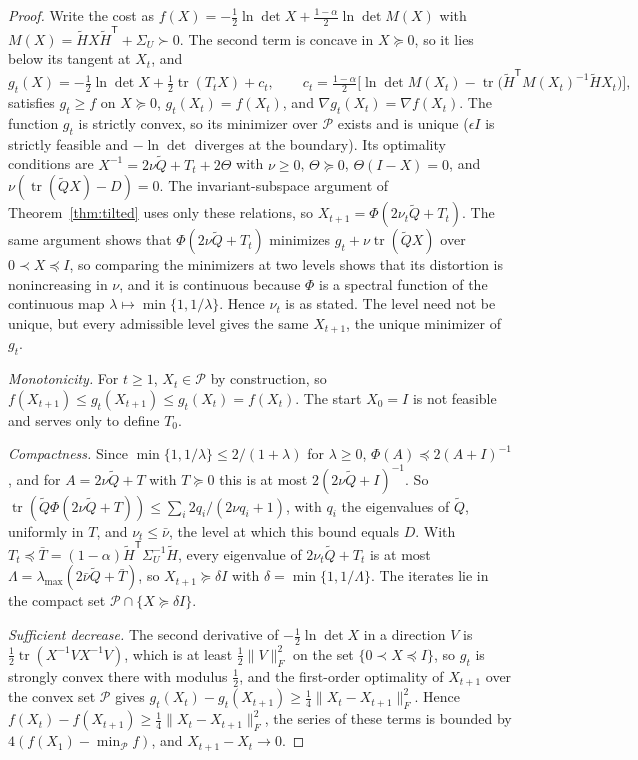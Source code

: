 \documentclass[11pt,onecolumn]{IEEEtran}
\newcommand{\tr}{\operatorname{tr}}
\begin{document}
\begin{proof}
Write the cost as
$f(X)=-\tfrac12\ln\det X+\tfrac{1-\alpha}2\ln\det M(X)$ with
$M(X)=\tilde HX\tilde H^{\mathsf T}+\Sigma_U\succ0$. The second term is concave
in $X\succeq0$, so it lies below its tangent at $X_t$, and
\[
g_t(X)=-\tfrac12\ln\det X+\tfrac12\tr(T_tX)+c_t,\qquad
c_t=\tfrac{1-\alpha}2\bigl[\ln\det M(X_t)-\tr\bigl(\tilde H^{\mathsf T}M(X_t)^{-1}\tilde HX_t\bigr)\bigr],
\]
satisfies $g_t\ge f$ on $X\succeq0$, $g_t(X_t)=f(X_t)$, and
$\nabla g_t(X_t)=\nabla f(X_t)$. The function $g_t$ is strictly convex, so
its minimizer over $\mathcal P$ exists and is unique ($\epsilon I$ is
strictly feasible and $-\ln\det$ diverges at the boundary). Its optimality
conditions are $X^{-1}=2\nu\tilde Q+T_t+2\Theta$ with $\nu\ge0$,
$\Theta\succeq0$, $\Theta(I-X)=0$, and $\nu(\tr(\tilde QX)-D)=0$. The
invariant-subspace argument of Theorem~\ref{thm:tilted} uses only these
relations, so $X_{t+1}=\Phi(2\nu_t\tilde Q+T_t)$. The same argument shows
that $\Phi(2\nu\tilde Q+T_t)$ minimizes $g_t+\nu\tr(\tilde QX)$ over
$0\prec X\preceq I$, so comparing the minimizers at two levels shows that
its distortion is nonincreasing in $\nu$, and it is continuous because
$\Phi$ is a spectral function of the continuous map
$\lambda\mapsto\min\{1,1/\lambda\}$. Hence $\nu_t$ is as stated. The level
need not be unique, but every admissible level gives the same
$X_{t+1}$, the unique minimizer of $g_t$.

\emph{Monotonicity.} For $t\ge1$, $X_t\in\mathcal P$ by construction, so
$f(X_{t+1})\le g_t(X_{t+1})\le g_t(X_t)=f(X_t)$. The start $X_0=I$ is not
feasible and serves only to define $T_0$.

\emph{Compactness.} Since $\min\{1,1/\lambda\}\le2/(1+\lambda)$ for
$\lambda\ge0$, $\Phi(A)\preceq2(A+I)^{-1}$, and for $A=2\nu\tilde Q+T$ with
$T\succeq0$ this is at most $2(2\nu\tilde Q+I)^{-1}$. So
$\tr(\tilde Q\Phi(2\nu\tilde Q+T))\le\sum_i2q_i/(2\nu q_i+1)$, with $q_i$ the
eigenvalues of $\tilde Q$, uniformly in $T$, and $\nu_t\le\bar\nu$, the
level at which this bound equals $D$. With
$T_t\preceq\bar T=(1-\alpha)\tilde H^{\mathsf T}\Sigma_U^{-1}\tilde H$, every
eigenvalue of $2\nu_t\tilde Q+T_t$ is at most
$\Lambda=\lambda_{\max}(2\bar\nu\tilde Q+\bar T)$, so $X_{t+1}\succeq\delta I$
with $\delta=\min\{1,1/\Lambda\}$. The iterates lie in the compact set
$\mathcal P\cap\{X\succeq\delta I\}$.

\emph{Sufficient decrease.} The second derivative of
$-\tfrac12\ln\det X$ in a direction $V$ is
$\tfrac12\tr(X^{-1}VX^{-1}V)$, which is at least $\tfrac12\|V\|_F^2$ on
the set $\{0\prec X\preceq I\}$, so $g_t$ is strongly
convex there with modulus $\tfrac12$, and the first-order optimality of
$X_{t+1}$ over the convex set $\mathcal P$ gives
$g_t(X_t)-g_t(X_{t+1})\ge\tfrac14\|X_t-X_{t+1}\|_F^2$. Hence
$f(X_t)-f(X_{t+1})\ge\tfrac14\|X_t-X_{t+1}\|_F^2$, the series of these
terms is bounded by $4(f(X_1)-\min_{\mathcal P}f)$, and $X_{t+1}-X_t\to0$.


\end{proof}
\end{document}
